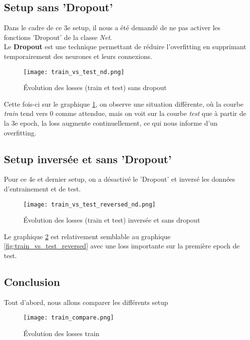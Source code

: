 \documentclass{article}
\begin{document}
\newpage
\subsection{Setup sans 'Dropout'}
\label{Setup_nd}

Dans le cadre de ce 3e setup, il nous a été demandé de ne pas activer les fonctions 'Dropout' de la classe \textit{Net}.\\
Le \textbf{Dropout} est une technique permettant de réduire l’overfitting en supprimant temporairement des neurones et leurs connexions. 

\begin{figure}[H]
    \centering
    \texttt{[image: train\_vs\_test\_nd.png]}
    \caption{Évolution des losses (train et test) sans dropout}
    \label{fig:train_vs_test_nd}
\end{figure}

Cette fois-ci sur le graphique \ref{fig:train_vs_test_nd}, on observe une situation différente, où la courbe \textit{train} tend vers 0 comme attendue, mais on voit sur la courbe \textit{test} que à partir de la 3e epoch, la loss augmente continuellement, ce qui nous informe d'un overfitting.

\newpage
\subsection{Setup inversée et sans 'Dropout'}

Pour ce 4e et dernier setup, on a désactivé le 'Dropout' et inversé les données d'entrainement et de test.

\begin{figure}[H]
    \centering
    \texttt{[image: train\_vs\_test\_reversed\_nd.png]}
    \caption{Évolution des losses (train et test) inversée et sans dropout}
    \label{fig:train_vs_test_reversed_nd}
\end{figure}

Le graphique \ref{fig:train_vs_test_reversed_nd} est relativement semblable au graphique \ref{fig:train_vs_test_reversed} avec une loss importante sur la première epoch de test.

\newpage
\subsection{Conclusion}

Tout d'abord, nous allons comparer les différents setup

\begin{figure}[H]
    \centering
    \texttt{[image: train\_compare.png]}
    \caption{Évolution des losses train}
    \label{fig:train_compare}
\end{figure}
\end{document}

